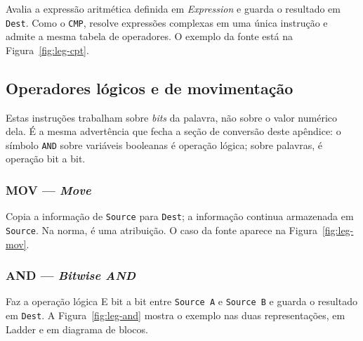 Avalia a expressão aritmética definida em \emph{Expression} e guarda o resultado em \texttt{Dest}. Como
o \texttt{CMP}, resolve expressões complexas em uma única instrução e admite a mesma tabela de
operadores.
O exemplo da fonte está na Figura~\ref{fig:leg-cpt}.


\subsection{Operadores lógicos e de movimentação}

Estas instruções trabalham sobre \emph{bits} da palavra, não sobre o valor numérico dela. É a mesma
advertência que fecha a seção de conversão deste apêndice: o símbolo \texttt{AND} sobre variáveis
booleanas é operação lógica; sobre palavras, é operação bit a bit.

\subsubsection{MOV --- \emph{Move}}

Copia a informação de \texttt{Source} para \texttt{Dest}; a informação continua armazenada em
\texttt{Source}. Na norma, é uma atribuição.
O caso da fonte aparece na Figura~\ref{fig:leg-mov}.


\subsubsection{AND --- \emph{Bitwise AND}}

Faz a operação lógica E bit a bit entre \texttt{Source A} e \texttt{Source B} e guarda o resultado em
\texttt{Dest}.
A Figura~\ref{fig:leg-and} mostra o exemplo nas duas representações, em Ladder e em diagrama de blocos.



